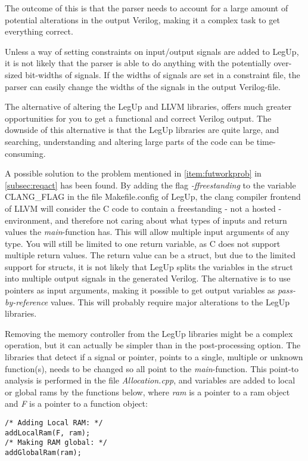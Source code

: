The outcome of this is that the parser needs to account for a large amount of potential alterations in the output Verilog, making it a complex task to get everything correct.

Unless a way of setting constraints on input/output signals are added to LegUp, it is not likely that the parser is able to do anything with the potentially over-sized bit-widths of signals. If the widths of signals are set in a constraint file, the parser can easily change the widths of the signals in the output Verilog-file.

The alternative of altering the LegUp and LLVM libraries, offers much greater opportunities for you to get a functional and correct Verilog output. The downside of this alternative is that the LegUp libraries are quite large, and searching, understanding and altering large parts of the code can be time-consuming. 

A possible solution to the problem mentioned in \cref{item:futworkprob} in \cref{subsec:reqact} has been found. By adding the flag \textit{-ffreestanding} to the variable CLANG\_FLAG in the file Makefile.config of LegUp, the clang compiler frontend of LLVM will consider the C code to contain a freestanding - not a hosted - environment, and therefore not caring about what types of inputs and return values the \textit{main}-function has. This will allow multiple input arguments of any type. You will still be limited to one return variable, as C does not support multiple return values. The return value can be a struct, but due to the limited support for structs, it is not likely that LegUp splits the variables in the struct into multiple output signals in the generated Verilog. The alternative is to use pointers as input arguments, making it possible to get output variables as \textit{pass-by-reference} values. This will probably require major alterations to the LegUp libraries.   

Removing the memory controller from the LegUp libraries might be a complex operation, but it can actually be simpler than in the post-processing option. The libraries that detect if a signal or pointer, points to a single, multiple or unknown function(s), needs to be changed so all point to the \textit{main}-function. This point-to analysis is performed in the file \textit{Allocation.cpp}, and variables are added to local or global \gls{ram}s by the functions below, where \textit{ram} is a pointer to a \gls{ram} object and \textit{F} is a pointer to a function object:
\lstset{language=C,style=Cstyle}
\begin{lstlisting}
/* Adding Local RAM: */
addLocalRam(F, ram);
/* Making RAM global: */
addGlobalRam(ram);
\end{lstlisting}

